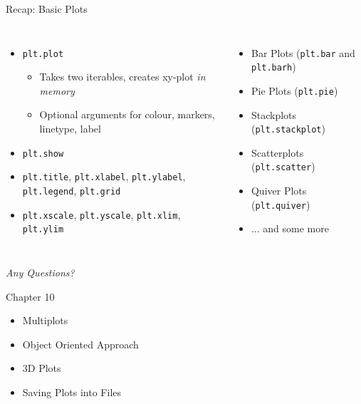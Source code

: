 
\begin{frame}[t,plain]
\titlepage
\end{frame}


\begin{frame}{Recap: Basic Plots}
%
\begin{columns}[T]
\begin{itemize}
\item \texttt{plt.plot}
	\begin{itemize}
	\item Takes two iterables, creates xy-plot \emph{in memory}
	\item Optional arguments for colour, markers, linetype, label
	\end{itemize}
\item \texttt{plt.show}
\item \texttt{plt.title}, \texttt{plt.xlabel}, \texttt{plt.ylabel}, \texttt{plt.legend}, \texttt{plt.grid}
\item \texttt{plt.xscale}, \texttt{plt.yscale}, \texttt{plt.xlim}, \texttt{plt.ylim}
\end{itemize}
%
\begin{itemize}
\item Bar Plots (\texttt{plt.bar} and \texttt{plt.barh})
\item Pie Plots (\texttt{plt.pie})
\item Stackplots (\texttt{plt.stackplot})
\item Scatterplots (\texttt{plt.scatter})
\item Quiver Plots (\texttt{plt.quiver})
\item ... and some more
\end{itemize}
\end{columns}
%
\begin{center}
	\emph{Any Questions?}
\end{center}
%
\end{frame}


\begin{frame}[fragile]{Chapter 10}
%
\begin{itemize}
\item Multiplots
\item Object Oriented Approach
\item 3D Plots
\item Saving Plots into Files
\end{itemize}
%
\end{frame}

